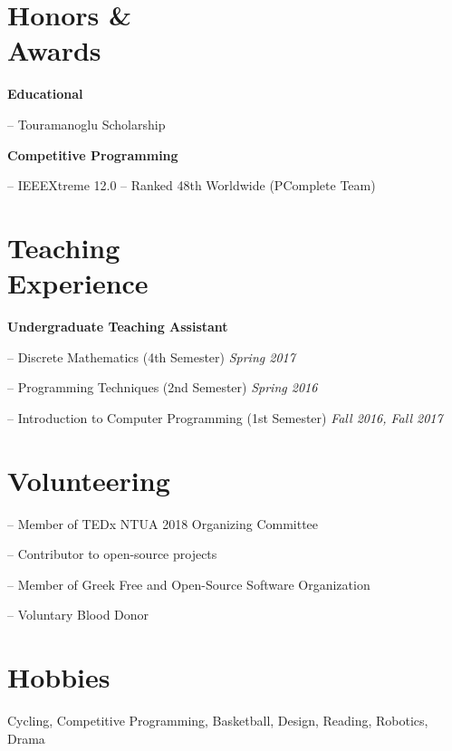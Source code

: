 \documentclass[margin]{res}
\begin{document}
\begin{resume}
\section{Honors \& \\ Awards} 
\textbf{Educational} 
\begin{compactitem}
    \item [--] Touramanoglu Scholarship
\end{compactitem} 
\textbf{Competitive Programming} 
\begin{compactitem}
    \item[--] IEEEXtreme 12.0 -- Ranked 48th Worldwide (PComplete Team)
\end{compactitem}



\section{Teaching \\ Experience} 
\textbf{Undergraduate Teaching Assistant}
\begin{compactitem}
    \item[--] Discrete Mathematics (4th Semester) \hfill \emph{Spring 2017}
    \item[--] Programming Techniques (2nd Semester) \hfill \emph{Spring 2016}
    \item[--] Introduction to Computer Programming (1st Semester) \hfill \emph{Fall 2016, Fall 2017}
\end{compactitem}


\section{Volunteering} 
\begin{compactitem}

    \item[--] Member of TEDx NTUA 2018 Organizing Committee 
    \item[--] Contributor to open-source projects
    \item[--] Member of Greek Free and Open-Source Software Organization
    \item[--] Voluntary Blood Donor

\end{compactitem}

\section{Hobbies}
Cycling, Competitive Programming, Basketball, Design, Reading, Robotics, Drama

\end{resume}
\(\)
\end{document}
